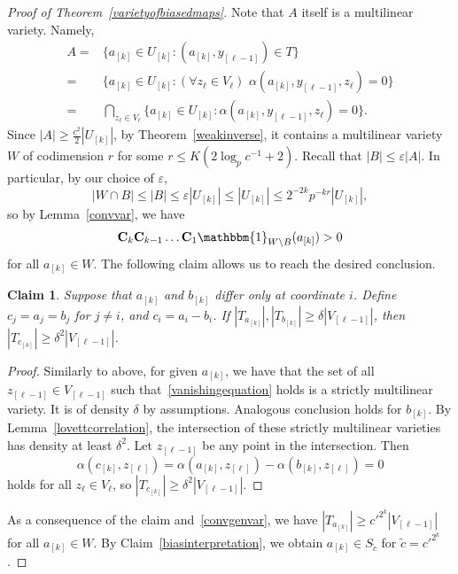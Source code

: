 \documentclass[a4paper,11pt]{article}
\newtheorem{claim}[theorem]{Claim}
\theoremstyle{definition}
\newcommand\id{\mathbbm{1}}
\newcommand{\bigconv}[1]{
	\mathbf{C}_{#1}
}
\begin{document}
\begin{proof}[Proof of Theorem~\ref{varietyofbiasedmaps}]
Note that $A$ itself is a multilinear variety. Namely,
\begin{align*}A = & \{a_{[k]} \in U_{[k]} : (a_{[k]}, y_{[\ell-1]}) \in T\} \\
= &\Big\{a_{[k]} \in U_{[k]} : (\forall z_\ell \in V_\ell)\,\,\alpha(a_{[k]}, y_{[\ell-1]}, z_\ell) = 0 \Big\}\\
= & \bigcap_{z_\ell \in V_\ell} \Big\{a_{[k]} \in U_{[k]} : \alpha(a_{[k]}, y_{[\ell-1]}, z_\ell) = 0\Big\}.
\end{align*}
Since $|A| \geq \frac{c^2}{2}|U_{[k]}|$, by Theorem~\ref{weakinverse}, it contains a multilinear variety $W$ of codimension $r$ for some $r \leq K(2 \log_p c^{-1} + 2)$. Recall that $|B| \leq \varepsilon |A|$. In particular, by our choice of $\varepsilon$,
\[|W \cap B|\leq |B| \leq \varepsilon|U_{[k]}| \leq  |U_{[k]}| \leq 2^{-2k} p^{-kr} |U_{[k]}|,\]
so by Lemma~\ref{convvar}, we have
\begin{equation}\bigconv{k}\bigconv{k-1} \dots \bigconv{1} \id_{W \setminus B}(a_{[k]}) > 0\label{convgenvar}\end{equation}
for all $a_{[k]} \in W$. The following claim allows us to reach the desired conclusion.

\begin{claim}
    Suppose that $a_{[k]}$ and $b_{[k]}$ differ only at coordinate $i$. Define $c_j = a_j = b_j$ for $j \not= i$, and $c_i = a_i - b_i$. If $|T_{a_{[k]}}|, |T_{b_{[k]}}| \geq \delta |V_{[\ell-1]}|$, then $|T_{c_{[k]}}| \geq \delta^2 |V_{[\ell-1]}|$.
\end{claim}


\begin{proof}
    Similarly to above, for given $a_{[k]}$, we have that the set of all $z_{[\ell-1]} \in V_{[\ell-1]}$ such that~\eqref{vanishingequation} holds is a strictly multilinear variety. It is of density $\delta$ by assumptions. Analogous conclusion holds for $b_{[k]}$. By Lemma~\ref{lovettcorrelation}, the intersection of these strictly multilinear varieties has density at least $\delta^2$. Let $z_{[\ell-1]}$ be any point in the intersection. Then
    \[\alpha(c_{[k]}, z_{[\ell]}) = \alpha(a_{[k]}, z_{[\ell]}) - \alpha(b_{[k]}, z_{[\ell]}) = 0\]
    holds for all $z_\ell \in V_\ell$, so $|T_{c_{[k]}}| \geq \delta^2 |V_{[\ell - 1]}|$.
\end{proof}

As a consequence of the claim and~\eqref{convgenvar}, we have $|T_{a_{[k]}}| \geq {c'}^{2^k}|V_{[\ell - 1]}|$ for all $a_{[k]} \in W$. By Claim~\ref{biasinterpretation}, we obtain $a_{[k]} \in S_{\tilde{c}}$ for $\tilde{c} = {c'}^{2^k}$.
\end{proof}
\end{document}
